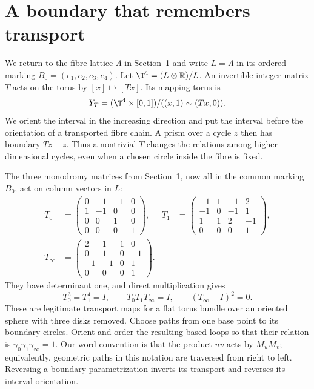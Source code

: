 \section{A boundary that remembers transport}\label{ntg:sec:boundary}

We return to the fibre lattice $\Lambda$ in Section~1 and write
$L=\Lambda$ in its ordered marking $B_0=(e_1,e_2,e_3,e_4)$. Let
$\T^4=(L\otimes\mathbb R)/L$. An invertible integer matrix $T$ acts
on the torus by $[x]\mapsto[Tx]$. Its mapping torus is
\[
 Y_T=(\T^4\times[0,1])/((x,1)\sim(Tx,0)).
\]
We orient the interval in the increasing direction and put the interval
before the orientation of a transported fibre chain. A prism over a
cycle $z$ then has boundary $Tz-z$. Thus a nontrivial $T$ changes the
relations among higher-dimensional cycles, even when a chosen circle
inside the fibre is fixed.

The three monodromy matrices from Section~1, now all in the common
marking $B_0$, act on column vectors in $L$:
\begin{equation}\label{ntg:eq:native}
\begin{aligned}
 T_0&=\begin{pmatrix}0&-1&-1&0\\1&-1&0&0\\0&0&1&0\\0&0&0&1\end{pmatrix},
 &T_1&=\begin{pmatrix}-1&1&-1&2\\-1&0&-1&1\\1&1&2&-1\\0&0&0&1\end{pmatrix},\\
 T_\infty&=\begin{pmatrix}2&1&1&0\\0&1&0&-1\\-1&-1&0&1\\0&0&0&1\end{pmatrix}.
\end{aligned}
\end{equation}
They have determinant one, and direct multiplication gives
\[
 T_0^3=T_1^4=I,\qquad T_0T_1T_\infty=I,
 \qquad (T_\infty-I)^2=0.
\]
These are legitimate transport maps for a flat torus bundle over an
oriented sphere with three disks removed. Choose paths from one base
point to its boundary circles. Orient and order the resulting based
loops so that their relation is $\gamma_0\gamma_1\gamma_\infty=1$.
Our word convention is that the product $uv$ acts by $M_uM_v$;
equivalently, geometric paths in this notation are traversed from
right to left. Reversing a boundary parametrization inverts its
transport and reverses its interval orientation.

